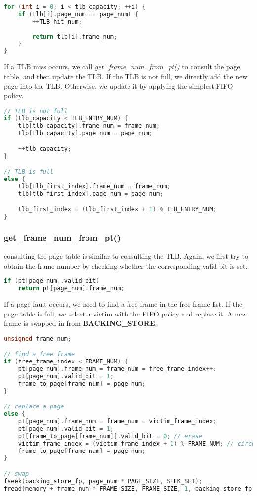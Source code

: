 \documentclass{article}
\begin{document}
\begin{lstlisting}[language=c, caption={TLB Hit}]
for (int i = 0; i < tlb_capacity; ++i) {
    if (tlb[i].page_num == page_num) {
        ++TLB_hit_num;
        
        return tlb[i].frame_num;
    }
}
\end{lstlisting}

If a TLB miss occurs, we call \textit{get\_frame\_num\_from\_pt()} to consult the page table, and then update the TLB. If the TLB is not full, we directly add the new page into the TLB. Otherwise, we update it by applying the simplest FIFO policy.

\begin{lstlisting}[language=c, caption={TLB Miss}]
// TLB is not full
if (tlb_capacity < TLB_ENTRY_NUM) {
    tlb[tlb_capacity].frame_num = frame_num;
    tlb[tlb_capacity].page_num = page_num;

    ++tlb_capacity;
}

// TLB is full
else {
    tlb[tlb_first_index].frame_num = frame_num;
    tlb[tlb_first_index].page_num = page_num;

    tlb_first_index = (tlb_first_index + 1) % TLB_ENTRY_NUM;
}
\end{lstlisting}

\subsubsection*{get\_frame\_num\_from\_pt()}
consulting the page table is similar to consulting the TLB. Again, we first try to obtain the frame number by checking whether the corresponding valid bit is set.

\begin{lstlisting}[language=c, caption={Consulting the Page Table}]
if (pt[page_num].valid_bit)
    return pt[page_num].frame_num;    
\end{lstlisting}

If a page fault occurs, we need to find a free-frame in the free frame list. If the page table is full, we select a victim with the FIFO policy and replace it. A new frame is swapped in from \textbf{BACKING\_STORE}.

\begin{lstlisting}[language=c, caption={Page Fault}]
unsigned frame_num;

// find a free frame
if (free_frame_index < FRAME_NUM) {
    pt[page_num].frame_num = frame_num = free_frame_index++;
    pt[page_num].valid_bit = 1;
    frame_to_page[frame_num] = page_num;
}

// replace a page
else {
    pt[page_num].frame_num = frame_num = victim_frame_index;
    pt[page_num].valid_bit = 1;
    pt[frame_to_page[frame_num]].valid_bit = 0; // erase
    victim_frame_index = (victim_frame_index + 1) % FRAME_NUM; // circular array
    frame_to_page[frame_num] = page_num;
}

// swap
fseek(backing_store_fp, page_num * PAGE_SIZE, SEEK_SET);
fread(memory + frame_num * FRAME_SIZE, FRAME_SIZE, 1, backing_store_fp);
\end{lstlisting}
\end{document}
